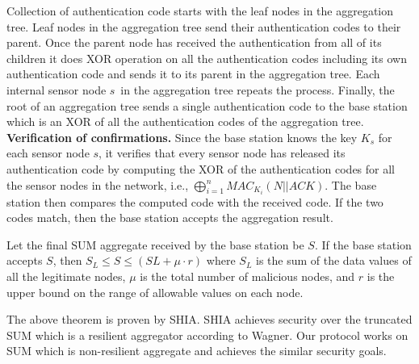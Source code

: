 	Collection of authentication code starts with the leaf nodes in the aggregation tree.
	Leaf nodes in the aggregation tree send their authentication codes to their parent.
	Once the parent node has received the authentication from all of its children it does XOR operation on all the authentication codes including its own authentication code and sends it to its parent in the aggregation tree.
	Each internal sensor node $s$\ in the aggregation tree repeats the process.
	Finally, the root of an aggregation tree sends a single authentication code to the base station which is an XOR of all the authentication codes of the aggregation tree.\\  
	\textbf{Verification of confirmations.}
	Since the base station knows the key $K_{s}$ for each sensor node $s$, it verifies that every sensor node has released its authentication code by computing the XOR of the authentication codes for all the sensor nodes in the network, i.e., $\bigoplus_{i = 1}^n MAC_{K_{i}}(N || ACK)$.
	The base station then compares the computed code with the received code. If the two codes match, then the base station accepts the aggregation result.

	\begin{theorem}
		\cite{chan2006secure}
		Let the final SUM aggregate received by the base station be $S$.
		If the base station accepts $S$, then $S_{L} \leq S \leq (SL + \mu \cdot r)$ where $S_{L}$ is the sum of the data values of all the legitimate nodes, $\mu$ is the total number of malicious nodes, and $r$ is the upper bound on the range of allowable values on each node.
	\end{theorem}
	The above theorem is proven by SHIA. SHIA achieves security over the truncated SUM which is a resilient aggregator according to Wagner\cite{wagner2004resilient}.
	Our protocol works on SUM which is non-resilient aggregate and achieves the similar security goals. 
